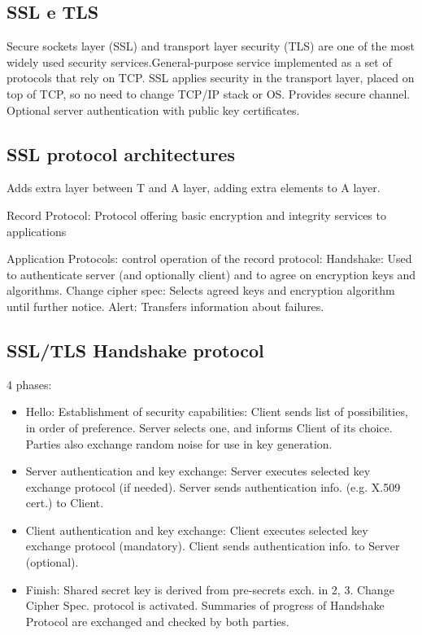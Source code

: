 \subsection{SSL e TLS}
Secure sockets layer (SSL) and transport layer security (TLS) are one of the most
widely used security services.General-purpose service
implemented as a set of
protocols that rely on TCP.
SSL applies security in the transport layer, placed on top of TCP, so no need to change TCP/IP stack or OS.
Provides secure channel. Optional server authentication with public key certificates.

\subsection{SSL protocol architectures} 
Adds extra layer between T and A layer, adding extra elements to A layer.

Record Protocol: Protocol offering
basic encryption and integrity
services to applications

Application Protocols: control operation
of the record protocol: Handshake: Used to authenticate server (and optionally client) and to agree on
encryption keys and algorithms. Change cipher spec: Selects agreed keys and encryption algorithm until further
notice. Alert: Transfers information about failures.

\subsection{SSL/TLS Handshake protocol}
4 phases:
\begin{itemize}
    \item Hello: Establishment of security capabilities: Client sends list of possibilities, in
order of preference. Server selects one, and informs Client of its choice. Parties also
exchange random noise for use in key generation.
 \item Server authentication and key exchange: Server executes selected key exchange
protocol (if needed). Server sends authentication info. (e.g. X.509 cert.) to Client.
\item Client authentication and key exchange: Client executes selected key exchange
protocol (mandatory). Client sends authentication info. to Server (optional).
\item Finish: Shared secret key is derived from pre-secrets exch. in 2, 3. Change Cipher
Spec. protocol is activated. Summaries of progress of Handshake Protocol are
exchanged and checked by both parties.
\end{itemize}

